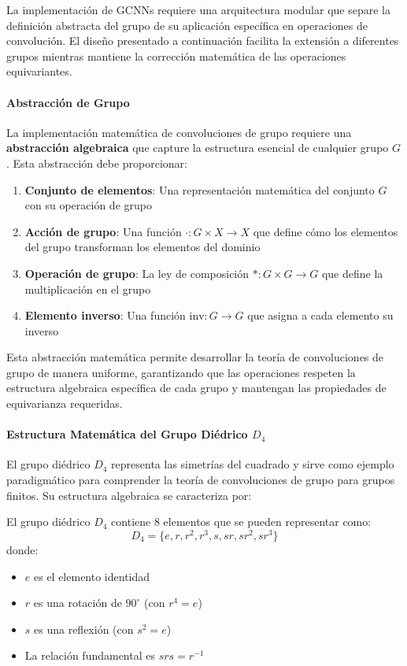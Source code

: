 La implementación de \glspl{GCNN} requiere una arquitectura modular que separe la definición abstracta del grupo de su aplicación específica en operaciones de convolución. El diseño presentado a continuación facilita la extensión a diferentes grupos mientras mantiene la corrección matemática de las operaciones equivariantes.

\paragraph{Abstracción de Grupo}

La implementación matemática de convoluciones de grupo requiere una \textbf{abstracción algebraica} que capture la estructura esencial de cualquier grupo $G$. Esta abstracción debe proporcionar:

\begin{enumerate}
    \item \textbf{Conjunto de elementos}: Una representación matemática del conjunto $G$ con su operación de grupo
    \item \textbf{Acción de grupo}: Una función $\cdot: G \times X \to X$ que define cómo los elementos del grupo transforman los elementos del dominio
    \item \textbf{Operación de grupo}: La ley de composición $*: G \times G \to G$ que define la multiplicación en el grupo
    \item \textbf{Elemento inverso}: Una función $\text{inv}: G \to G$ que asigna a cada elemento su inverso
\end{enumerate}

Esta abstracción matemática permite desarrollar la teoría de convoluciones de grupo de manera uniforme, garantizando que las operaciones respeten la estructura algebraica específica de cada grupo y mantengan las propiedades de equivarianza requeridas.

\paragraph{Estructura Matemática del Grupo Diédrico $D_4$}

El grupo diédrico $D_4$ representa las simetrías del cuadrado y sirve como ejemplo paradigmático para comprender la teoría de convoluciones de grupo para grupos finitos. Su estructura algebraica se caracteriza por:

\begin{definition}[Elementos de $D_4$]
El grupo diédrico $D_4$ contiene 8 elementos que se pueden representar como:
\begin{equation}
D_4 = \{e, r, r^2, r^3, s, sr, sr^2, sr^3\}
\end{equation}
donde:
\begin{itemize}
    \item $e$ es el elemento identidad
    \item $r$ es una rotación de $90^\circ$ (con $r^4 = e$)
    \item $s$ es una reflexión (con $s^2 = e$)
    \item La relación fundamental es $srs = r^{-1}$
\end{itemize}
\end{definition}

